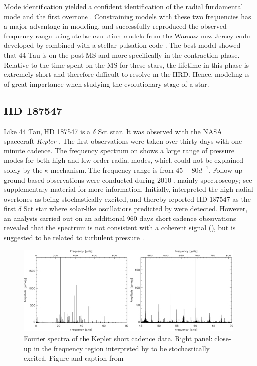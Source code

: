 Mode identification yielded a confident identification of the radial fundamental mode and the first overtone \citep{lenz2008asteroseismic}. Constraining models with these two frequencies has a major advantage in modeling, and \citet{lenz2010delta} successfully reproduced the observed frequency range using stellar evolution models from the Warsaw new Jersey code developed by combined with a stellar pulsation code \citep{paczynski1969envelopes}. The best model showed that 44 Tau is on the post-MS and more specifically in the contraction phase. Relative to the time spent on the MS for these stars, the lifetime in this phase is extremely short and therefore difficult to resolve in the HRD. Hence, modeling is of great importance when studying the evolutionary stage of a star. 
\\


\subsection{HD 187547}

Like 44 Tau, HD 187547 is a $\delta$ Sct star. It was observed  with the NASA spacecraft \textit{Kepler} \citep{koch2010kepler}. The first observations were taken over thirty days with one minute cadence. The frequency spectrum on  shows a large range of pressure modes for both high and low order radial modes, which could not be explained solely by the $\kappa$ mechanism. The frequency range is from $45-80 d^{-1}$. Follow up ground-based observations were conducted during 2010 \citep{antoci2011excitation}, mainly spectroscopy; see \citet{antoci2011excitation} supplementary material for more information. Initially, \citet{antoci2011excitation} interpreted the high radial overtones as being stochastically excited, and thereby reported HD 187547 as the first $\delta$ Sct star where solar-like oscillations predicted by \citet{houdek1999, samadi2002} were detected.  However, an analysis carried out on an additional 960 days short cadence observations revealed that the spectrum is not consistent with a coherent signal (), but is suggested to be related to turbulent pressure \citep{antoci2014role}. 

\begin{figure}[htbp]
    \centering
    \includegraphics[width=1\textwidth]{superstarspectrum.jpg}
    \caption{Fourier spectra of the Kepler short cadence data. Right panel: close-up in the frequency region interpreted by \citet{antoci2011solar} to be stochastically excited. Figure and caption from \citet{antoci2014role}}
    \label{ssspectrum}
\end{figure}

